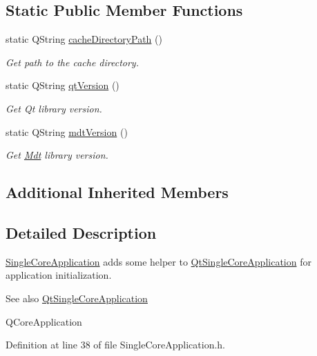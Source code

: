 \subsection*{Static Public Member Functions}
\begin{DoxyCompactItemize}
\item 
static Q\+String \hyperlink{class_mdt_1_1_single_core_application_a9081eaa0ddfc35ed1360f64fbe52c18a}{cache\+Directory\+Path} ()
\begin{DoxyCompactList}\small\item\em Get path to the cache directory. \end{DoxyCompactList}\item 
static Q\+String \hyperlink{class_mdt_1_1_single_core_application_a19c7ede35e9fe6beca09d49235327a34}{qt\+Version} ()
\begin{DoxyCompactList}\small\item\em Get Qt library version. \end{DoxyCompactList}\item 
static Q\+String \hyperlink{class_mdt_1_1_single_core_application_a17db75d06f3ba6be926f39620c45b383}{mdt\+Version} ()
\begin{DoxyCompactList}\small\item\em Get \hyperlink{namespace_mdt}{Mdt} library version. \end{DoxyCompactList}\end{DoxyCompactItemize}
\subsection*{Additional Inherited Members}


\subsection{Detailed Description}
\hyperlink{class_mdt_1_1_single_core_application}{Single\+Core\+Application} adds some helper to \hyperlink{class_qt_single_core_application}{Qt\+Single\+Core\+Application} for application initialization. 

\begin{DoxySeeAlso}{See also}
\hyperlink{class_qt_single_core_application}{Qt\+Single\+Core\+Application} 

Q\+Core\+Application 
\end{DoxySeeAlso}


Definition at line 38 of file Single\+Core\+Application.\+h.



